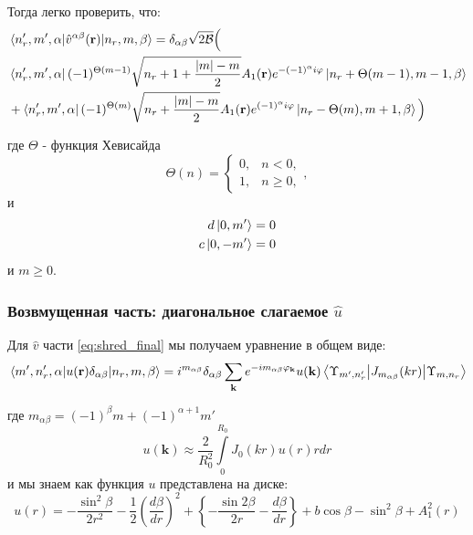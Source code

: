 \documentclass[a4paper,article,14pt]{extarticle}
\begin{document}
Тогда легко проверить, что:
\begin{equation}
\begin{aligned}
&\mel{n_r',m',\alpha} {\hat v^{\alpha \beta}(\mathbf{r}) }{n_r, m,\beta} =
 \delta_{\alpha \beta} \sqrt{ {2\cal{B}} } \Big( \\
&\bra{n_r',m',\alpha} (-1)^{\Theta(m-1)}  \sqrt{n_r + 1 + \frac{|m| - m}{2}  }  A_{1} (\mathbf{r}) e^{ -(-1)^{\alpha} i \varphi}   \ket{n_r+\Theta(m-1), m-1,\beta}  \\
&+ \bra{n_r',m',\alpha} (-1)^{\Theta(m)} \sqrt{  n_r + \frac{|m| - m}{2}  }  A_{1} (\mathbf{r}) e^{(-1)^\alpha i \varphi} \ket{n_r-\Theta(m), m +1 ,\beta}   \Big) \\
\end{aligned}
\end{equation}

\noindent где $\Theta$ - функция Хевисайда
$$
\Theta(n)=\begin{cases} 0, & n < 0, \\ 1, & n \ge 0, \end{cases},
$$
и
\begin{equation}
\begin{aligned}
d \ket{0, m'} &= 0 \\
c \ket{0, -m'} &= 0 \\
\end{aligned}
\end{equation}
\noindent и $m \ge 0$.


\subsubsection{Возвмущенная часть: диагональное слагаемое $\hat u$}
Для  $\hat v$ части \eqref{eq:shred_final} мы получаем уравнение в общем виде:
\begin{equation}
\mel{m', n'_r,\alpha} {u(\mathbf{r})  \delta_{\alpha \beta}}{n_r,m, \beta} = i^{m_{\alpha \beta} }  \delta_{\alpha \beta} \sum\limits_{\mathbf{k} }      e^{- i m_{\alpha \beta} \varphi_{\mathbf{k}}} u(\mathbf{k})\mel{\Upsilon_{m', n'_r}} {J_{m_{\alpha \beta}} (kr) }{\Upsilon_{m, n_r}}
\end{equation}

\noindent где $ m_{\alpha \beta} = (-1)^{\beta}m + (-1)^{\alpha+1} m' $
\begin{equation}
u (\mathbf{k}) \approx \frac{2}{R_0^2}  \int\limits_{0}^{R_0}  J_0 (k r ) u(r) r dr 
\end{equation} 
и мы знаем как функция $u$ представлена на диске:
\begin{equation}
u(r) = -\frac{\sin^2 \beta }{2r^2} - \frac{1}{2}\left( \frac{d\beta }{dr} \right)^2 +  \left\{  - \frac{\sin 2\beta }{2r}  - \frac{d\beta }{dr} \right\} + b\cos \beta - \sin ^ 2 \beta + A^2_1(r)
\end{equation}
\end{document}
